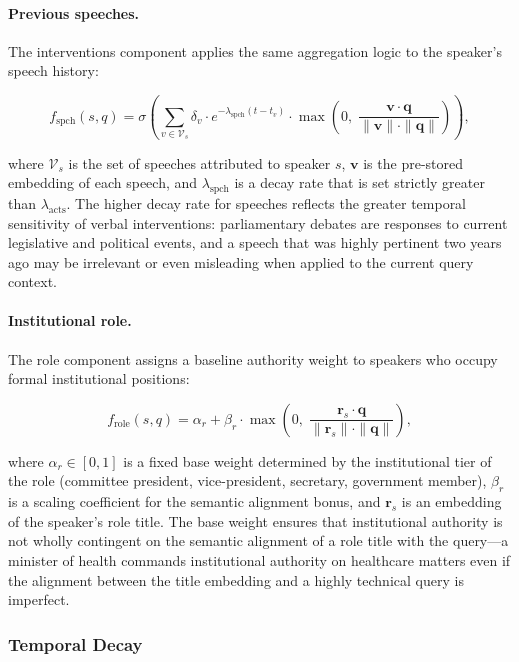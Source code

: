 \paragraph{Previous speeches.}
The interventions component applies the same aggregation logic to the speaker's speech history:

\begin{equation}
    f_\text{spch}(s, q) = \sigma\!\left(\sum_{v \in \mathcal{V}_s} \delta_v \cdot e^{-\lambda_\text{spch}(t - t_v)} \cdot \max\!\left(0,\; \frac{\mathbf{v} \cdot \mathbf{q}}{\|\mathbf{v}\| \cdot \|\mathbf{q}\|}\right)\right),
\end{equation}

where $\mathcal{V}_s$ is the set of speeches attributed to speaker $s$, $\mathbf{v}$ is the
pre-stored embedding of each speech, and $\lambda_\text{spch}$ is a decay rate that is set
strictly greater than $\lambda_\text{acts}$. The higher decay rate for speeches reflects the
greater temporal sensitivity of verbal interventions: parliamentary debates are responses to
current legislative and political events, and a speech that was highly pertinent two years ago
may be irrelevant or even misleading when applied to the current query context.

\paragraph{Institutional role.}
The role component assigns a baseline authority weight to speakers who occupy formal
institutional positions:

\begin{equation}
    f_\text{role}(s, q) = \alpha_r + \beta_r \cdot \max\!\left(0,\; \frac{\mathbf{r}_s \cdot \mathbf{q}}{\|\mathbf{r}_s\| \cdot \|\mathbf{q}\|}\right),
\end{equation}

where $\alpha_r \in [0, 1]$ is a fixed base weight determined by the institutional tier of the
role (committee president, vice-president, secretary, government member), $\beta_r$ is a scaling
coefficient for the semantic alignment bonus, and $\mathbf{r}_s$ is an embedding of the
speaker's role title. The base weight ensures that institutional authority is not wholly
contingent on the semantic alignment of a role title with the query---a minister of health
commands institutional authority on healthcare matters even if the alignment between the title
embedding and a highly technical query is imperfect.

\subsubsection{Temporal Decay}


